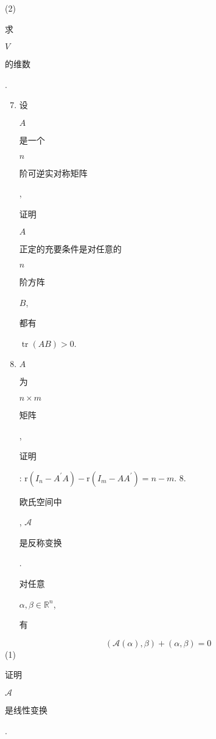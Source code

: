 \documentclass[10pt]{article}
\begin{document}
(2) \begin{CJK}{UTF8}{mj}求\end{CJK} $V$ \begin{CJK}{UTF8}{mj}的维数\end{CJK}.

\begin{enumerate}
  \setcounter{enumi}{6}
  \item \begin{CJK}{UTF8}{mj}设\end{CJK} $A$ \begin{CJK}{UTF8}{mj}是一个\end{CJK} $n$ \begin{CJK}{UTF8}{mj}阶可逆实对称矩阵\end{CJK}, \begin{CJK}{UTF8}{mj}证明\end{CJK} $A$ \begin{CJK}{UTF8}{mj}正定的充要条件是对任意的\end{CJK} $n$ \begin{CJK}{UTF8}{mj}阶方阵\end{CJK} $B$, \begin{CJK}{UTF8}{mj}都有\end{CJK} $\operatorname{tr}(A B)>0$.

  \item $A$ \begin{CJK}{UTF8}{mj}为\end{CJK} $n \times m$ \begin{CJK}{UTF8}{mj}矩阵\end{CJK}, \begin{CJK}{UTF8}{mj}证明\end{CJK}: $\mathrm{r}\left(I_{n}-A^{\prime} A\right)-\mathrm{r}\left(I_{m}-A A^{\prime}\right)=n-m$. 8. \begin{CJK}{UTF8}{mj}欧氏空间中\end{CJK}, $\mathscr{A}$ \begin{CJK}{UTF8}{mj}是反称变换\end{CJK}. \begin{CJK}{UTF8}{mj}对任意\end{CJK} $\alpha, \beta \in \mathbb{R}^{n}$, \begin{CJK}{UTF8}{mj}有\end{CJK}

\end{enumerate}
$$
(\mathscr{A}(\alpha), \beta)+(\alpha, \beta)=0
$$
(1) \begin{CJK}{UTF8}{mj}证明\end{CJK} $\mathscr{A}$ \begin{CJK}{UTF8}{mj}是线性变换\end{CJK}.\\
\end{document}
